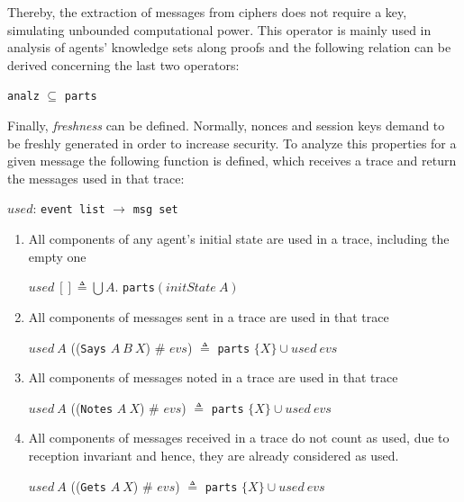 Thereby, the extraction of messages from ciphers does not require a key, simulating unbounded computational power. This operator is mainly used in analysis of agents' knowledge sets along proofs and the following relation can be derived concerning the last two operators:

\begin{center}
  \texttt{analz} \(\subseteq \) \texttt{parts}
\end{center}

Finally, \textit{freshness} can be defined. Normally, nonces and session keys demand to be freshly generated in order to increase security. To analyze this properties for a given message the following function is defined, which receives a trace and return the messages used in that trace:

\begin{center}
  \(used\): \texttt{event list} \(\longrightarrow \) \texttt{msg set}
\end{center}

\begin{enumerate}
  \item All components of any agent's initial state are used in a trace, including the empty one
  \begin{center}
    \(used\ [] \triangleq \bigcup A\). \texttt{parts}\( (initState\ A)\)
  \end{center}
  \item All components of messages sent in a trace are used in that trace
  \begin{center}
    \(used\ A\) ((\texttt{Says} \(A\ B\ X\)) \# \(evs\)) \(\triangleq \) \texttt{parts} \( \{X\} \cup used\ evs\)
  \end{center}
  \item All components of messages noted in a trace are used in that trace
  \begin{center}
    \(used\ A\) ((\texttt{Notes} \(A\ X\)) \# \(evs\)) \(\triangleq \) \texttt{parts} \( \{X\} \cup used\ evs\)
  \end{center}
  \item All components of messages received in a trace do not count as used, due to reception invariant and hence, they are already considered as used.
  \begin{center}
    \(used\ A\) ((\texttt{Gets} \(A\ X\)) \# \(evs\)) \(\triangleq \) \texttt{parts} \( \{X\} \cup used\ evs\)
  \end{center}
\end{enumerate}

